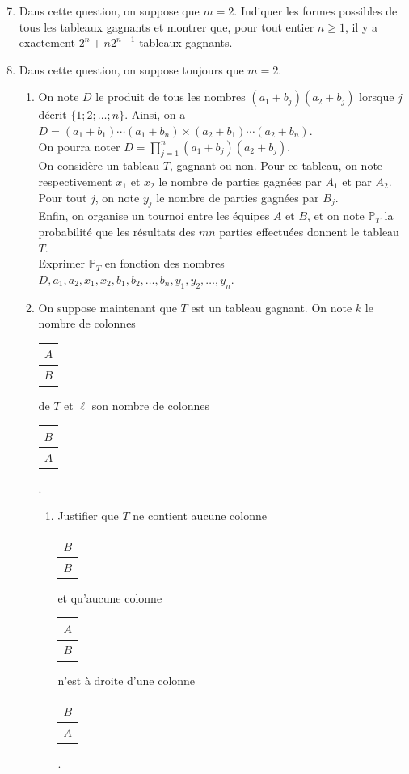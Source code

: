 \documentclass[landscape,twocolumn,leqno,a4paper,10pt]{report} %
\renewcommand{\geq}{\geqslant}
\begin{document}
\begin{enumerate}\setcounter{enumi}{6}
	\item Dans cette question, on suppose que $m=2$. Indiquer les formes possibles de tous les tableaux gagnants et montrer que, pour tout entier $n \geq 1$, il y a exactement $2^{n}+n 2^{n-1}$ tableaux gagnants.
	\item Dans cette question, on suppose toujours que $m=2$.
	\begin{enumerate}
		\item On note $D$ le produit de tous les nombres $\left(a_{1}+b_{j}\right)\left(a_{2}+b_{j}\right)$ lorsque $j$ décrit $\{1 ; 2 ; \ldots ; n\}$. Ainsi, on a $D=\left(a_{1}+b_{1}\right) \cdots\left(a_{1}+b_{n}\right) \times\left(a_{2}+b_{1}\right) \cdots\left(a_{2}+b_{n}\right)$.\\
		On pourra noter $\displaystyle D=\prod_{j=1}^{n}\left(a_{1}+b_{j}\right)\left(a_{2}+b_{j}\right)$.\\ 
		On considère un tableau $T$, gagnant ou non. Pour ce tableau, on note respectivement $x_{1}$ et $x_{2}$ le nombre de parties gagnées par $A_{1}$ et par $A_{2}$. Pour tout $j$, on note $y_{j}$ le nombre de parties gagnées par $B_{j}$.\\
		Enfin, on organise un tournoi entre les équipes $A$ et $B$, et on note $\mathbb{P}_{T}$ la probabilité que les résultats des $m n$ parties effectuées donnent le tableau $T$.\\
		Exprimer $\mathbb{P}_{T}$ en fonction des nombres $D, a_{1}, a_{2}, x_{1}, x_{2}, b_{1}, b_{2}, \ldots, b_{n}, y_{1}, y_{2}, \ldots, y_{n}$.
		\item On suppose maintenant que $T$ est un tableau gagnant. On note $k$ le nombre de colonnes \begin{tabular}{|c|} \hline$A$ \\ \hline$B$\\ \hline \end{tabular} de $T$ et $\ell$ son nombre de colonnes \begin{tabular}{|c|} \hline$B$ \\ \hline$A$\\ \hline \end{tabular}.
		\begin{enumerate}
			\item  Justifier que $T$ ne contient aucune colonne \begin{tabular}{|c|} \hline$B$ \\ \hline$B$\\ \hline \end{tabular} et qu'aucune colonne \begin{tabular}{|c|} \hline$A$ \\ \hline$B$\\ \hline \end{tabular} n'est à droite d'une colonne \begin{tabular}{|c|} \hline$B$ \\ \hline$A$\\\hline \end{tabular}.

\end{enumerate}
\end{enumerate}
\end{enumerate}
\end{document}
